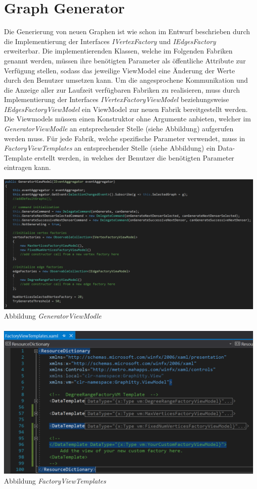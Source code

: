 \documentclass[13pt]{scrreprt}
\begin{document}
\section{Graph Generator}
Die Generierung von neuen Graphen ist wie schon im Entwurf beschrieben durch die Implementierung der Interfaces \textit{IVertexFactory} und \textit{IEdgesFactory} erweiterbar. Die implementierenden Klassen, welche im Folgenden Fabriken genannt werden, m{\"u}ssen ihre ben{\"o}tigten Parameter als {\"o}ffentliche Attribute zur Verf{\"u}gung stellen, sodass das jeweilige ViewModel eine {\"A}nderung der Werte durch den Benutzer umsetzen kann. Um die angesprochene Kommunikation und die Anzeige aller zur Laufzeit verf{\"u}gbaren Fabriken zu realisieren, muss durch Implementierung der Interfaces \textit{IVertexFactoryViewModel} beziehungsweise \textit{IEdgesFactoryViewModel} ein ViewModel zur neuen Fabrik bereitgestellt werden. Die Viewmodels müssen einen Konstruktor ohne Argumente anbieten, welcher im \textit{GeneratorViewModle} an entsprechender Stelle (siehe Abbildung) aufgerufen werden muss. F{\"u}r jede Fabrik, welche spezifische Parameter verwendet, muss in \textit{FactoryViewTemplates} an entsprechender Stelle (siehe Abbildung) ein Data-Template erstellt werden, in welches der Benutzer die ben{\"o}tigten Parameter eintragen kann.

\newpage
\includegraphics[scale=0.6,center]{GeneratorViewModelKonstruktor.PNG}
Abbildung \textit{GeneratorViewModle}
\\ \\

\includegraphics[scale=0.87,center]{FactoryViewDataTemplate.PNG}
Abbildung \textit{FactoryViewTemplates}

\glsaddall
\printnoidxglossaries
\end{document}
